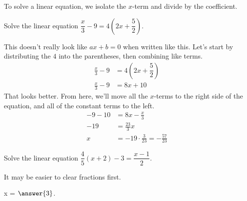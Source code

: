 \documentclass{ximera}
\begin{document}
To solve a linear equation, we isolate the $x$-term and divide by the coefficient.
\begin{example}
	Solve the linear equation $\displaystyle \dfrac{x}{3} - 9 = 4\left( 2x + \dfrac{5}{2} \right)$.

	\begin{explanation}
		This doesn't really look like $ax + b = 0$ when written like this.  Let's start by distributing the $4$ into 
		the parentheses, then combining like terms.
		\begin{align*}
			\frac{x}{3} - 9 &= 4\left( 2x + \dfrac{5}{2} \right) \\
			\frac{x}{3} - 9 &= 8x + 10
		\end{align*}
		That looks better.  From here, we'll move all the $x$-terms to the right side of the equation, and all of
		the constant terms to the left.
		\begin{align*}
			- 9 - 10 &= 8x - \frac{x}{3}\\
			-19 &= \frac{23}{3} x \\
			x &= -19 \cdot \frac{3}{23} = -\frac{57}{23}
		\end{align*}
	\end{explanation}	
\end{example}


\begin{problem}
 	Solve the linear equation $\displaystyle \dfrac{4}{5}\left(x+2\right) - 3 = \dfrac{x-1}{2}$. 
 	\begin{hint}
    		It may be easier to clear fractions first.
	\end{hint}
  	\begin{prompt}
    		x = $\answer{3}$.
  	\end{prompt}
\end{problem}
\end{document}
